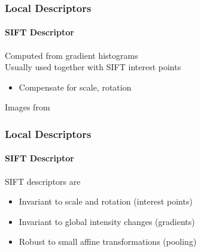 \documentclass[xetex,professionalfont]{beamer}
\begin{document}

\begin{frame}
\frametitle{Local Descriptors}
\framesubtitle{SIFT Descriptor}

Computed from gradient histograms\\\medskip
Usually used together with SIFT interest points
\begin{itemize}
    \item Compensate for scale, rotation %
\end{itemize}

\bigskip
\begin{center}
    {\centering Images from \cite{prince12}}
\end{center}

\end{frame}


\begin{frame}
\frametitle{Local Descriptors}
\framesubtitle{SIFT Descriptor}

SIFT descriptors are
\begin{itemize}
    \item Invariant to scale and rotation (interest points)
    \item Invariant to global intensity changes (gradients)
    \item Robust to small affine transformations (pooling)
\end{itemize}

\end{frame}

\end{document}

